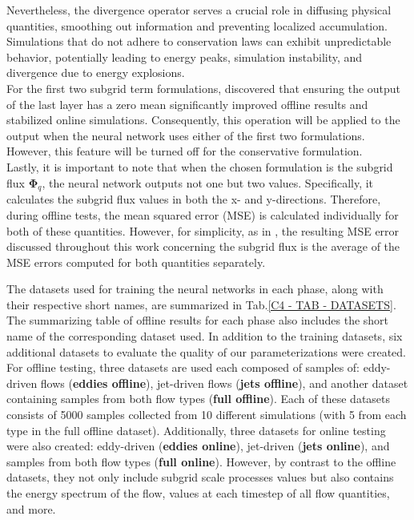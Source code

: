 \newpage

Nevertheless, the divergence operator serves a crucial role in diffusing physical quantities, smoothing out information and preventing localized accumulation. Simulations that do not adhere to conservation laws can exhibit unpredictable behavior, potentially leading to energy peaks, simulation instability, and divergence due to energy explosions.\\

For the first two subgrid term formulations, \cite{Benchmarking} discovered that ensuring the output of the last layer has a zero mean significantly improved offline results and stabilized online simulations. Consequently, this operation will be applied to the output when the neural network uses either of the first two formulations. However, this feature will be turned off for the conservative formulation.\\

Lastly, it is important to note that when the chosen formulation is the subgrid flux $\mathbf{\Phi}_q$, the neural network outputs not one but two values. Specifically, it calculates the subgrid flux values in both the x- and y-directions. Therefore, during offline tests, the mean squared error (MSE) is calculated individually for both of these quantities. However, for simplicity, as in \cite{Benchmarking}, the resulting MSE error discussed throughout this work concerning the subgrid flux is the average of the MSE errors computed for both quantities separately.\\


The datasets used for training the neural networks in each phase, along with their respective short names, are summarized in Tab.\ref{C4 - TAB - DATASETS}. The summarizing table of offline results for each phase also includes the short name of the corresponding dataset used. In addition to the training datasets, six additional datasets to evaluate the quality of our parameterizations were created.\\

For offline testing, three datasets are used each composed of samples of: eddy-driven flows (\textbf{eddies offline}),  jet-driven flows (\textbf{jets offline}), and another dataset containing samples from both flow types (\textbf{full offline}). Each of these datasets consists of 5000 samples collected from 10 different simulations (with 5 from each type in the full offline dataset). Additionally, three datasets for online testing were also created: eddy-driven (\textbf{eddies online}), jet-driven (\textbf{jets online}), and samples from both flow types (\textbf{full online}). However, by contrast to the offline datasets, they not only include subgrid scale processes values but also contains the energy spectrum of the flow, values at each timestep of all flow quantities, and more.

